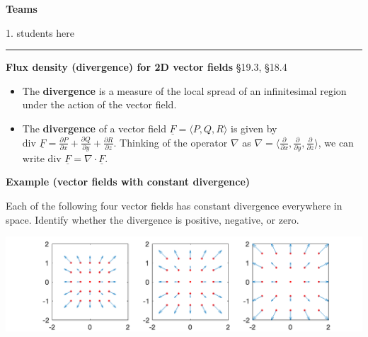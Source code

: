 \documentclass[12pt,letterpaper,noanswers]{exam}
\newcommand{\mb}[1]{\underline{#1}}
\begin{document}
\noindent\textbf{Teams}
\begin{multicols}{2}

1.  students here
\end{multicols}



\vspace{0.2cm}
\hrule
\vspace{0.2cm}
\noindent\textbf{Flux density (divergence) for 2D vector fields} \S 19.3, \S 18.4
\begin{tcolorbox}
\begin{itemize}
\itemsep0em
    \item The \textbf{divergence} is a measure of the local spread of an infinitesimal region under the action of the vector field.
    \item The \textbf{divergence} of a vector field $\mb F = \langle P,Q,R\rangle$ is given by $\text{div }\mb F = \frac{\partial P}{\partial x}+\frac{\partial Q}{\partial y}+\frac{\partial R}{\partial z}$.  Thinking of the operator $\nabla$ as $\nabla = \langle \frac{\partial }{\partial x},\frac{\partial}{\partial y},\frac{\partial}{\partial z}\rangle$, we can write $\text{div }\mb F = \nabla \cdot \mb F$.
\end{itemize}
\end{tcolorbox}

\noindent\textbf{Example (vector fields with constant divergence)}

Each of the following four vector fields  has constant divergence everywhere in space.  Identify whether the divergence is positive, negative, or zero.

\includegraphics[width=0.9\linewidth]{img/C26p1a.png}

\end{document}
